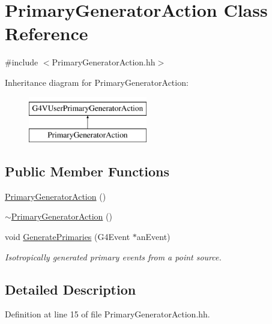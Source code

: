 \hypertarget{class_primary_generator_action}{\section{Primary\-Generator\-Action Class Reference}
\label{class_primary_generator_action}
}


{\ttfamily \#include $<$Primary\-Generator\-Action.\-hh$>$}

Inheritance diagram for Primary\-Generator\-Action\-:\begin{figure}[H]
\begin{center}
\leavevmode
\includegraphics[height=2.000000cm]{class_primary_generator_action}
\end{center}
\end{figure}
\subsection*{Public Member Functions}
\begin{DoxyCompactItemize}
\item 
\hyperlink{class_primary_generator_action_a4bbef83d397d84b434541f8720bf747d}{Primary\-Generator\-Action} ()
\item 
\hyperlink{class_primary_generator_action_ad236fbc210171b9178446778b6bdfb40}{$\sim$\-Primary\-Generator\-Action} ()
\item 
void \hyperlink{class_primary_generator_action_a67d83efdbb2b6e6f97a001dc921ea003}{Generate\-Primaries} (G4\-Event $\ast$an\-Event)
\begin{DoxyCompactList}\small\item\em Isotropically generated primary events from a point source. \end{DoxyCompactList}\end{DoxyCompactItemize}


\subsection{Detailed Description}


Definition at line 15 of file Primary\-Generator\-Action.\-hh.



